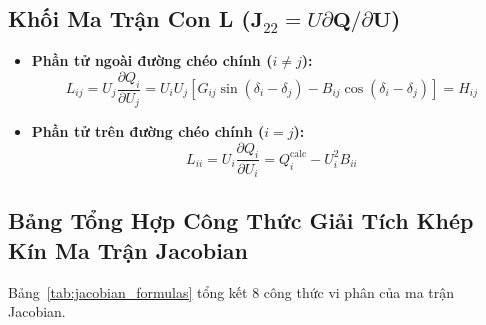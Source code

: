 \documentclass[12pt,a4paper,oneside]{report}
\begin{document}
\subsection{Khối Ma Trận Con L ($\mathbf{J}_{22} = U \partial \mathbf{Q} / \partial \mathbf{U}$)}
\begin{itemize}
    \item \textbf{Phần tử ngoài đường chéo chính ($i \ne j$):}
    \begin{equation}
    L_{ij} = U_j \frac{\partial Q_i}{\partial U_j} = U_i U_j \left[ G_{ij} \sin(\delta_i - \delta_j) - B_{ij} \cos(\delta_i - \delta_j) \right] = H_{ij}
    \end{equation}
    \item \textbf{Phần tử trên đường chéo chính ($i = j$):}
    \begin{equation}
    L_{ii} = U_i \frac{\partial Q_i}{\partial U_i} = Q_i^{\text{calc}} - U_i^2 B_{ii}
    \end{equation}
\end{itemize}

\subsection{Bảng Tổng Hợp Công Thức Giải Tích Khép Kín Ma Trận Jacobian}
Bảng~\ref{tab:jacobian_formulas} tổng kết 8 công thức vi phân của ma trận Jacobian.

\begin{table}[H]
\centering
\caption{Công thức giải tích khép kín các phần tử ma trận Jacobian tọa độ cực.}
\label{tab:jacobian_formulas}
\end{table}
\end{document}
